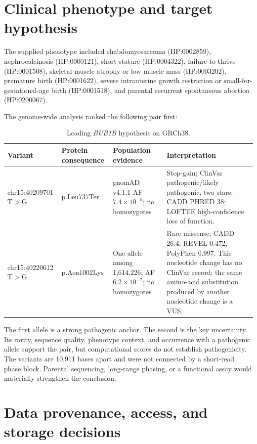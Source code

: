 \documentclass[11pt]{article}
\begin{document}
\section{Clinical phenotype and target hypothesis}

The supplied phenotype included rhabdomyosarcoma (HP:0002859), nephrocalcinosis (HP:0000121), short stature (HP:0004322), failure to thrive (HP:0001508), skeletal muscle atrophy or low muscle mass (HP:0003202), premature birth (HP:0001622), severe intrauterine growth restriction or small-for-gestational-age birth (HP:0001518), and parental recurrent spontaneous abortion (HP:0200067).

The genome-wide analysis ranked the following pair first:

\begin{table}[H]
\centering
\caption{Leading \textit{BUB1B} hypothesis on GRCh38.}
\small
\begin{tabularx}{\textwidth}{p{}p{}p{}Y}
\toprule
Variant & Protein consequence & Population evidence & Interpretation \\
\midrule
chr15:40209701 T$>$G & p.Leu737Ter & gnomAD v4.1.1 AF $7.4\times10^{-5}$; no homozygotes & Stop-gain; ClinVar pathogenic/likely pathogenic, two stars; CADD PHRED 38; LOFTEE high-confidence loss of function. \\
chr15:40220612 T$>$G & p.Asn1002Lys & One allele among 1,614,226; AF $6.2\times10^{-7}$; no homozygotes & Rare missense; CADD 26.4, REVEL 0.472, PolyPhen 0.997. This nucleotide change has no ClinVar record; the same amino-acid substitution produced by another nucleotide change is a VUS. \\
\bottomrule
\end{tabularx}
\end{table}

The first allele is a strong pathogenic anchor. The second is the key uncertainty. Its rarity, sequence quality, phenotype context, and occurrence with a pathogenic allele support the pair, but computational scores do not establish pathogenicity. The variants are 10,911 bases apart and were not connected by a short-read phase block. Parental sequencing, long-range phasing, or a functional assay would materially strengthen the conclusion.
\section{Data provenance, access, and storage decisions}
\end{document}
